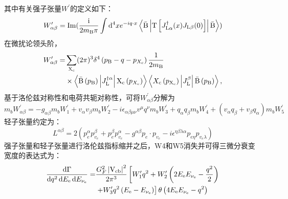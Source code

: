 其中有关强子张量$W^{\prime}$的定义如下：
\begin{equation}
W_{\alpha \beta}^{\prime}=\operatorname{Im}(\frac{\mathrm{i}}{2m_{\mathrm{B}}\pi} \int \mathrm{d}^4 x e^{-i q \cdot x} \left\langle\mathrm{\bar{B}}\left|\operatorname{T}\left[J_{\mathrm{L} \alpha}^{\dagger}(x) J_{\mathrm{L} \beta}(0)\right]\right|\mathrm{ \bar{B}}\right\rangle)
\end{equation}
在微扰论领头阶，
\begin{equation}
    \begin{aligned}
    W_{\alpha \beta}^{\prime} = & \sum_{\mathrm{X}_{\mathrm{c}}} (2 \pi)^3 \delta^4 \left( p_{\mathrm{B}} - q - p_{X_{\mathrm{c}}} \right) \frac{1}{2 m_{\mathrm{B}}} \\
    & \times \left\langle \mathrm{\bar{B} }\left( p_{\mathrm{B}} \right) \left| J_{\mathrm{L}}^{\dagger \alpha} \right| \mathrm{X_{\mathrm{c}} }\left( p_{X_{\mathrm{c}}} \right) \right\rangle \left\langle X_{\mathrm{c}} \left( p_{\mathrm{X_{\mathrm{c}}}} \right) \left| J_{\mathrm{L}}^\beta \right| \mathrm{\bar{B}} \left( p_{\mathrm{B}} \right) \right\rangle,
    \end{aligned}
    \end{equation}    
基于洛伦兹对称性和电荷共轭对称性，可将$W_{\alpha \beta}^{\prime}$分解为
\begin{equation}
    m_{b}W^{\prime}_{\alpha \beta}=-g_{\alpha \beta} m_{b}W^{\prime}_1+v_\alpha v_\beta m_{b}W_2^{\prime}-i \epsilon_{\alpha \beta \mu \nu} v^\mu q^\nu m_{b} W_3^{\prime}+q_\alpha q_\beta m_{b} W_4^{\prime}+\left(v_\alpha q_\beta+v_\beta q_\alpha\right)m_{b} W_5^{\prime}
\end{equation}
轻子张量约定为：
\begin{equation}
L^{\alpha \beta}=2\left(p_e^\alpha p_{v_e}^\beta+p_e^\beta p_{v_e}^\alpha-g^{\alpha \beta} p_e \cdot p_{v_e}-i \epsilon^{\eta \beta \lambda \alpha} p_{e \eta} p_{v_e \lambda}\right)
\end{equation}
强子张量和轻子张量进行洛伦兹指标缩并之后，W4和W5消失并可得三微分衰变宽度的表达式为：
\begin{equation}
    \begin{aligned}
    \frac{\mathrm{d} \Gamma}{\mathrm{d} q^2 \, \mathrm{d} E_{\mathrm{e}} \, \mathrm{d} E_{\mathrm{\nu_e}}} = & \frac{G_F^2 \left| \mathrm{V}_{\mathrm{cb}} \right|^2}{2 \pi^3} \left[ W_1^{\prime} q^2 + W_2^{\prime} \left( 2 E_{\mathrm{e}} E_{\mathrm{\nu_e}} - \frac{q^2}{2} \right) \right. \\
    & \left. + W_3^{\prime} q^2 \left( E_{\mathrm{e}} - E_{\mathrm{\nu_e}} \right) \right] \theta \left( 4 E_{\mathrm{e}} E_{\mathrm{\nu_e}} - q^2 \right)
    \end{aligned}
    \end{equation}    
